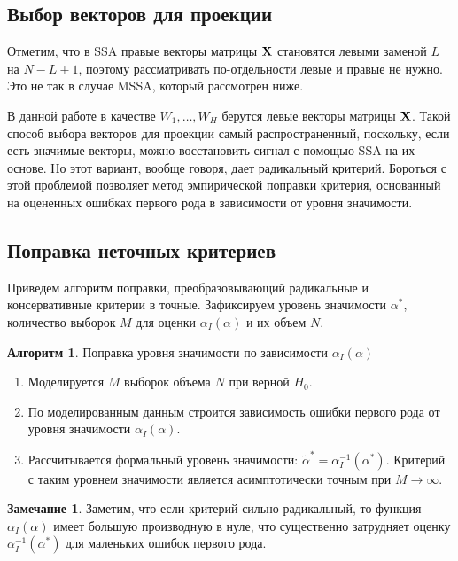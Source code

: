 \documentclass[specialist,
substylefile = spbu_report.rtx,
subf,href,colorlinks=true, 12pt]{disser}
\theoremstyle{definition}
\newtheorem{algorithm}{Алгоритм}
\newtheorem{remark}{Замечание}
\begin{document}
\subsection{Выбор векторов для проекции}\label{sect:vectors_choise}
Отметим, что в SSA правые векторы матрицы $\mathbf{X}$ становятся левыми заменой $L$ на $N-L+1$, поэтому рассматривать по-отдельности левые и правые не нужно. Это не так в случае MSSA, который рассмотрен ниже.

В данной работе в качестве $W_1, \ldots,W_H$ берутся левые векторы матрицы $\mathbf{X}$. Такой способ выбора векторов для проекции самый распространенный, поскольку, если есть значимые векторы, можно восстановить сигнал с помощью SSA на их основе. Но этот вариант, вообще говоря, дает радикальный критерий. Бороться с этой проблемой позволяет метод эмпирической поправки критерия, основанный на оцененных ошибках первого рода в зависимости
от уровня значимости.

\subsection{Поправка неточных критериев}\label{sect:correction}
Приведем алгоритм поправки, преобразовывающий радикальные и консервативные критерии в точные. Зафиксируем уровень значимости $\alpha^*$, количество выборок $M$ для оценки $\alpha_I(\alpha)$ и их объем $N$.
\begin{algorithm}{Поправка уровня значимости по зависимости $\alpha_I(\alpha)$}~\cite{Larin_2022}\label{alg:correction}
	\begin{enumerate}
		\item Моделируется $M$ выборок объема $N$ при верной $H_0$.
		\item По моделированным данным строится зависимость ошибки первого рода от уровня значимости $\alpha_I(\alpha)$.
		\item Рассчитывается формальный уровень значимости: $\widetilde{\alpha}^*=\alpha_I^{-1}(\alpha^*)$. Критерий с таким уровнем значимости является асимптотически точным при $M\to\infty$.
	\end{enumerate}
\end{algorithm}

\begin{remark}
Заметим, что если критерий сильно радикальный, то функция $\alpha_I(\alpha)$ имеет большую производную в нуле, что существенно затрудняет оценку $\alpha_I^{-1}(\alpha^*)$ для маленьких ошибок первого рода.
\end{remark}
\end{document}
